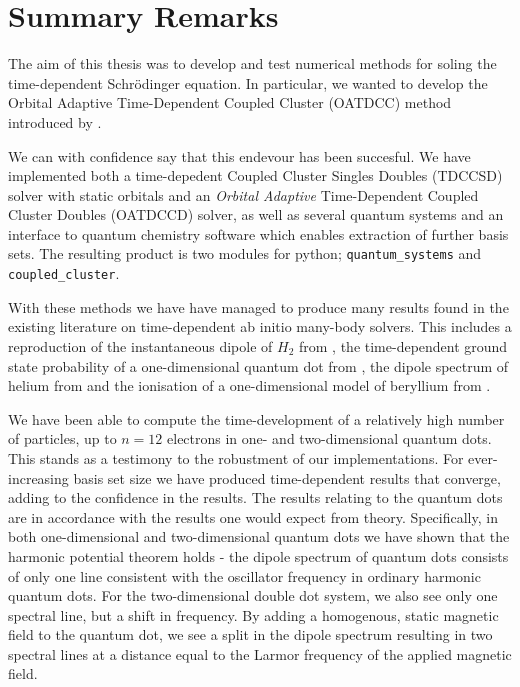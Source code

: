 \chapter{Summary Remarks}

The aim of this thesis was to develop and test numerical methods for 
soling the time-dependent Schrödinger equation. In particular, we 
wanted to develop the Orbital Adaptive Time-Dependent Coupled Cluster 
(OATDCC) method introduced by \citeauthor{kvaal2012ab}\cite{kvaal2012ab}.

We can with confidence say that this endevour has been succesful.
We have implemented both 
a time-depedent Coupled Cluster Singles Doubles (TDCCSD) solver with 
static orbitals and an \emph{Orbital Adaptive} Time-Dependent Coupled Cluster 
Doubles (OATDCCD) solver, as well as several quantum systems and an interface 
to quantum chemistry software which enables extraction of further basis sets.
The resulting product is two modules for python; \lstinline{quantum_systems} 
and \lstinline{coupled_cluster}.

With these methods we have have managed to produce 
many results found in the existing literature on time-dependent ab initio 
many-body solvers. This includes a reproduction of the instantaneous dipole 
of $H_2$ from \citeauthor{li2005time}\cite{li2005time}, the time-dependent 
ground state probability of a one-dimensional quantum dot from 
\citeauthor{Zanghellini04}\cite{Zanghellini04}, the dipole spectrum of 
helium from \citeauthor{pedersen2019symplectic}\cite{pedersen2019symplectic}
and the ionisation of a one-dimensional model of beryllium from 
\citeauthor{miyagi2013time}\cite{miyagi2013time}.

We have been able to compute the time-development 
of a relatively high number of particles, up to $n=12$ electrons in one- and
two-dimensional quantum dots. This stands as a testimony to the robustment 
of our implementations. For ever-increasing basis set size we have produced 
time-dependent results that converge, adding to the confidence in the results.
The results relating to the quantum dots are in accordance with the 
results one would expect from theory. Specifically, in both one-dimensional 
and two-dimensional quantum dots we have shown that the harmonic potential 
theorem\cite{kohn1961cyclotron} holds - the dipole spectrum of quantum 
dots consists of only one line consistent with the oscillator frequency in 
ordinary harmonic quantum dots. For the two-dimensional double dot system,
we also see only one spectral line, but a shift in frequency. By adding a homogenous,
static magnetic field to the quantum dot, we see a split in the dipole spectrum 
resulting in two spectral lines at a distance equal to the Larmor frequency of 
the applied magnetic field.


